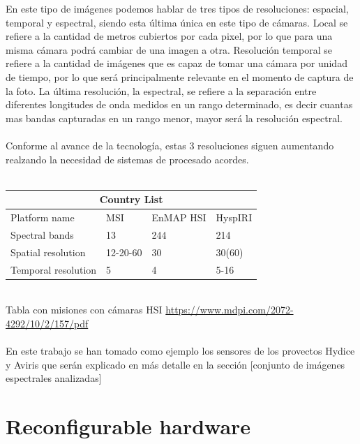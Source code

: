 \bigskip
En este tipo de imágenes podemos hablar de tres tipos de resoluciones: espacial, temporal y espectral, siendo esta última única en este tipo de cámaras. Local se refiere a la cantidad de metros cubiertos por cada pixel, por lo que para una misma cámara podrá cambiar de una imagen a otra. Resolución temporal se refiere a la cantidad de imágenes que es capaz de tomar una cámara por unidad de tiempo, por lo que será principalmente relevante en el momento de captura de la foto. La última resolución, la espectral, se refiere a la separación entre diferentes longitudes de onda medidos en un rango determinado, es decir cuantas mas bandas capturadas en un rango menor, mayor será la resolución espectral.
\\
\\
Conforme al avance de la tecnología, estas 3 resoluciones siguen aumentando realzando la necesidad de sistemas de procesado acordes.
\\
\\
\begin{tabular}{ |p{3cm}||p{3cm}|p{3cm}|p{3cm}|  }
 \hline
 \multicolumn{4}{|c|}{Country List} \\
 \hline
 Platform name       & MSI &EnMAP HSI&HyspIRI\\
 \hline
 Spectral bands      & 13    &244&   214\\
 Spatial resolution  &   12-20-60  & 30   &30(60)\\
 Temporal resolution &5 & 4&  5-16\\
 \hline
\end{tabular}
\\
Tabla con misiones con cámaras HSI
\url{https://www.mdpi.com/2072-4292/10/2/157/pdf}
\\
\\
En este trabajo se han tomado como ejemplo los sensores de los provectos Hydice y Aviris que serán explicado en más detalle en la sección [conjunto de imágenes espectrales analizadas]


\section{Reconfigurable hardware}

